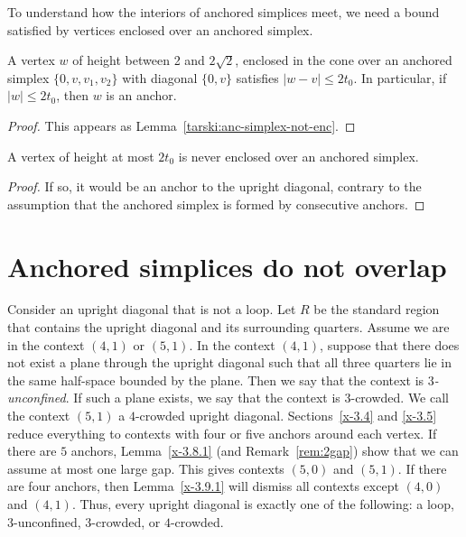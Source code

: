 To understand how the interiors of anchored simplices meet, we
need a bound satisfied by vertices enclosed over an anchored
simplex.

\begin{lemma}
    \label{lemma:anc-simplex-not-enc}
A vertex $w$ of height between 2 and $2\sqrt{2}$, enclosed in the cone
over an anchored simplex $\{0,v,v_1,v_2\}$ with diagonal $\{0,v\}$ satisfies
$|w-v|\le 2t_0$. In particular, if $|w|\le 2t_0$, then $w$ is an anchor.
\end{lemma}

\begin{proof}
This appears as Lemma~\ref{tarski:anc-simplex-not-enc}.
\end{proof}


\begin{corollary}
A vertex of height at most $2t_0$ is never enclosed over an anchored
simplex.
\end{corollary}

\begin{proof}  If so, it would be an anchor to the upright diagonal, contrary to
the assumption that the anchored simplex is formed by consecutive
anchors.
\end{proof}


\section{Anchored simplices do not overlap} %



\begin{definition}
Consider an upright diagonal that is not a loop. Let $R$ be the
standard region that contains the upright diagonal and its
surrounding quarters.  Assume we are in the context $(4,1)$ or
$(5,1)$.  In the context $(4,1)$, suppose that there does not exist
a plane through the upright diagonal such that all three quarters
lie in the same half-space bounded by the plane. Then we say that
the context is {\it $3$-unconfined}. If such a plane exists, we say
that the context is $3$-crowded. We call the context $(5,1)$ a
$4$-crowded upright diagonal. Sections~\ref{x-3.4} and \ref{x-3.5}
reduce everything to contexts with four or five anchors around each
vertex.  If there are $5$ anchors, Lemma~\ref{x-3.8.1} (and
Remark~\ref{rem:2gap}) show that we can assume at most one large
gap. This gives contexts $(5,0)$ and $(5,1)$.  If there are four
anchors, then Lemma~\ref{x-3.9.1} will dismiss all contexts except
$(4,0)$ and $(4,1)$. Thus, every upright diagonal is exactly one of
the following: a loop, $3$-unconfined, $3$-crowded, or $4$-crowded.
\end{definition}



